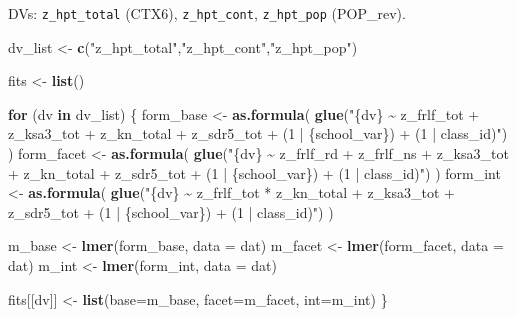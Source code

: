 \documentclass[
  10pt,
]{article}
\newenvironment{Shaded}{\begin{snugshade}}{\end{snugshade}}
\newcommand{\AttributeTok}[1]{\textcolor[rgb]{0.13,0.29,0.53}{#1}}
\newcommand{\ControlFlowTok}[1]{\textcolor[rgb]{0.13,0.29,0.53}{\textbf{#1}}}
\newcommand{\FunctionTok}[1]{\textcolor[rgb]{0.13,0.29,0.53}{\textbf{#1}}}
\newcommand{\NormalTok}[1]{#1}
\newcommand{\OtherTok}[1]{\textcolor[rgb]{0.56,0.35,0.01}{#1}}
\newcommand{\StringTok}[1]{\textcolor[rgb]{0.31,0.60,0.02}{#1}}
\begin{document}
DVs: \texttt{z\_hpt\_total} (CTX6), \texttt{z\_hpt\_cont},
\texttt{z\_hpt\_pop} (POP\_rev).

\begin{Shaded}
\begin{Highlighting}[]
\NormalTok{dv\_list }\OtherTok{\textless{}{-}} \FunctionTok{c}\NormalTok{(}\StringTok{"z\_hpt\_total"}\NormalTok{,}\StringTok{"z\_hpt\_cont"}\NormalTok{,}\StringTok{"z\_hpt\_pop"}\NormalTok{)}

\NormalTok{fits }\OtherTok{\textless{}{-}} \FunctionTok{list}\NormalTok{()}

\ControlFlowTok{for}\NormalTok{ (dv }\ControlFlowTok{in}\NormalTok{ dv\_list) \{}
\NormalTok{  form\_base  }\OtherTok{\textless{}{-}} \FunctionTok{as.formula}\NormalTok{(}
    \FunctionTok{glue}\NormalTok{(}\StringTok{"\{dv\} \textasciitilde{} z\_frlf\_tot + z\_ksa3\_tot + z\_kn\_total + z\_sdr5\_tot + (1 | \{school\_var\}) + (1 | class\_id)"}\NormalTok{)}
\NormalTok{  )}
\NormalTok{  form\_facet }\OtherTok{\textless{}{-}} \FunctionTok{as.formula}\NormalTok{(}
    \FunctionTok{glue}\NormalTok{(}\StringTok{"\{dv\} \textasciitilde{} z\_frlf\_rd + z\_frlf\_ns + z\_ksa3\_tot + z\_kn\_total + z\_sdr5\_tot + (1 | \{school\_var\}) + (1 | class\_id)"}\NormalTok{)}
\NormalTok{  )}
\NormalTok{  form\_int   }\OtherTok{\textless{}{-}} \FunctionTok{as.formula}\NormalTok{(}
    \FunctionTok{glue}\NormalTok{(}\StringTok{"\{dv\} \textasciitilde{} z\_frlf\_tot * z\_kn\_total + z\_ksa3\_tot + z\_sdr5\_tot + (1 | \{school\_var\}) + (1 | class\_id)"}\NormalTok{)}
\NormalTok{  )}

\NormalTok{  m\_base  }\OtherTok{\textless{}{-}} \FunctionTok{lmer}\NormalTok{(form\_base,  }\AttributeTok{data =}\NormalTok{ dat)}
\NormalTok{  m\_facet }\OtherTok{\textless{}{-}} \FunctionTok{lmer}\NormalTok{(form\_facet, }\AttributeTok{data =}\NormalTok{ dat)}
\NormalTok{  m\_int   }\OtherTok{\textless{}{-}} \FunctionTok{lmer}\NormalTok{(form\_int,   }\AttributeTok{data =}\NormalTok{ dat)}

\NormalTok{  fits[[dv]] }\OtherTok{\textless{}{-}} \FunctionTok{list}\NormalTok{(}\AttributeTok{base=}\NormalTok{m\_base, }\AttributeTok{facet=}\NormalTok{m\_facet, }\AttributeTok{int=}\NormalTok{m\_int)}
\NormalTok{\}}
\end{Highlighting}
\end{Shaded}
\end{document}
